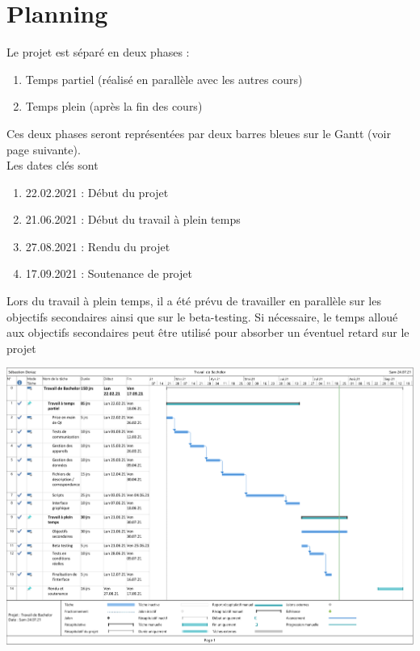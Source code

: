 \documentclass[AdvProjMgmt_Sebastien_Deriaz]{subfiles}
\begin{document}
\section{Planning}
Le projet est séparé en deux phases :
\begin{enumerate}
\item Temps partiel (réalisé en parallèle avec les autres cours)
\item Temps plein (après la fin des cours)
\end{enumerate}
Ces deux phases seront représentées par deux barres bleues sur le Gantt (voir page suivante).\\
Les dates clés sont
\begin{enumerate}
\item 22.02.2021 : Début du projet
\item 21.06.2021 : Début du travail à plein temps
\item 27.08.2021 : Rendu du projet
\item 17.09.2021 : Soutenance de projet
\end{enumerate}
Lors du travail à plein temps, il a été prévu de travailler en parallèle sur les objectifs secondaires ainsi que sur le beta-testing. Si nécessaire, le temps alloué aux objectifs secondaires peut être utilisé pour absorber un éventuel retard sur le projet
\begin{center}
\includegraphics[width=\textheight,angle=90]{Planning_TB.pdf}
\end{center}
\end{document}
